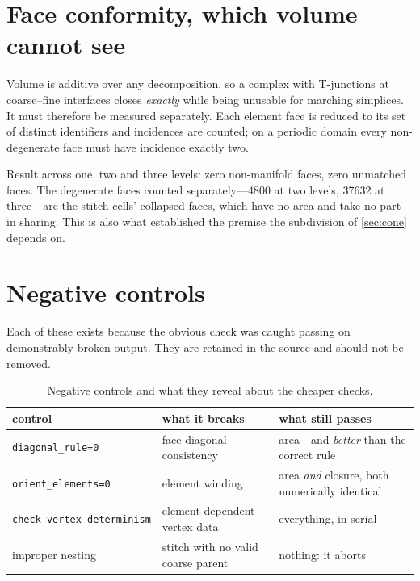 \section{Face conformity, which volume cannot see}
\label{sec:faces}

Volume is additive over any decomposition, so a complex with T-junctions at
coarse--fine interfaces closes \emph{exactly} while being unusable for marching
simplices. It must therefore be measured separately. Each element face is
reduced to its set of distinct identifiers and incidences are counted; on a
periodic domain every non-degenerate face must have incidence exactly two.

Result across one, two and three levels: zero non-manifold faces, zero unmatched
faces. The degenerate faces counted separately---4800 at two levels, 37632 at
three---are the stitch cells' collapsed faces, which have no area and take no
part in sharing. This is also what established the premise the subdivision of
\cref{sec:cone} depends on.

\section{Negative controls}
\label{sec:controls}

Each of these exists because the obvious check was caught passing on
demonstrably broken output. They are retained in the source and should not be
removed.

\begin{table}[htbp]
\centering
\caption{Negative controls and what they reveal about the cheaper checks.}
\label{tab:controls}
\begin{tabular}{p{}p{}p{}}
\toprule
control & what it breaks & what still passes \\
\midrule
\texttt{diagonal\_rule=0} & face-diagonal consistency &
  area---and \emph{better} than the correct rule \\
\texttt{orient\_elements=0} & element winding &
  area \emph{and} closure, both numerically identical \\
\texttt{check\_vertex\_determinism} & element-dependent vertex data &
  everything, in serial \\
improper nesting & stitch with no valid coarse parent &
  nothing: it aborts \\
\bottomrule
\end{tabular}
\end{table}

